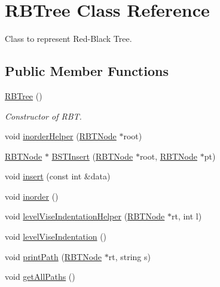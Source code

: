 \hypertarget{class_r_b_tree}{}\section{R\+B\+Tree Class Reference}
\label{class_r_b_tree}


Class to represent Red-\/\+Black Tree.  


\subsection*{Public Member Functions}
\begin{DoxyCompactItemize}
\item 
\hyperlink{class_r_b_tree_a19921f34f32f777bb3c4b85d4ff1d9de}{R\+B\+Tree} ()
\begin{DoxyCompactList}\small\item\em Constructor of R\+BT. \end{DoxyCompactList}\item 
void \hyperlink{class_r_b_tree_a9f693206c06a050b84a9ce241365e9cf}{inorder\+Helper} (\hyperlink{struct_r_b_t_node}{R\+B\+T\+Node} $\ast$root)
\item 
\hyperlink{struct_r_b_t_node}{R\+B\+T\+Node} $\ast$ \hyperlink{class_r_b_tree_ac4d5b255ece286dc3fdd791d2a46bded}{B\+S\+T\+Insert} (\hyperlink{struct_r_b_t_node}{R\+B\+T\+Node} $\ast$root, \hyperlink{struct_r_b_t_node}{R\+B\+T\+Node} $\ast$pt)
\item 
void \hyperlink{class_r_b_tree_ae0f34aa205c291c2c50f9e1be4299454}{insert} (const int \&data)
\item 
void \hyperlink{class_r_b_tree_aff8e5c4479e6708da9a6cbfc276836a3}{inorder} ()
\item 
void \hyperlink{class_r_b_tree_a3c9ae2993698192390a17a57df86febc}{level\+Vise\+Indentation\+Helper} (\hyperlink{struct_r_b_t_node}{R\+B\+T\+Node} $\ast$rt, int l)
\item 
void \hyperlink{class_r_b_tree_addb32f82fc392201f9b8d6f3aaddb382}{level\+Vise\+Indentation} ()
\item 
void \hyperlink{class_r_b_tree_ade103a94c3a3cd1f6a98a354d8f798d1}{print\+Path} (\hyperlink{struct_r_b_t_node}{R\+B\+T\+Node} $\ast$rt, string s)
\item 
void \hyperlink{class_r_b_tree_a12c03168e62443644c5043fd2ffb5f39}{get\+All\+Paths} ()
\end{DoxyCompactItemize}
